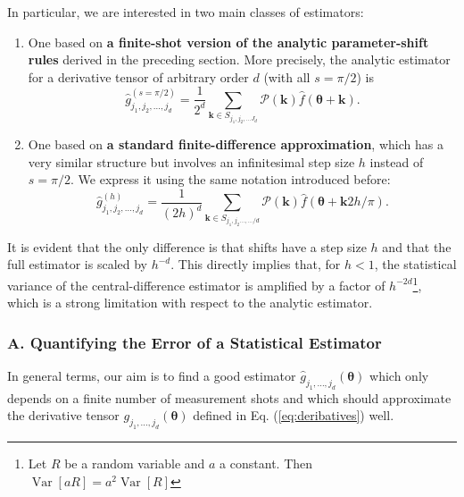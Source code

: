In particular, we are interested in two main classes of estimators: 
\begin{enumerate}
    \item One based on \textbf{a finite-shot version of the analytic parameter-shift rules} derived in the preceding section. More precisely, the analytic estimator for a derivative tensor of arbitrary order $d$ (with all $s=\pi /2$) is
\begin{equation}
    \hat{g}_{j_1, j_2, \ldots, j_d}^{(s=\pi / 2)}=\frac{1}{2^d} \sum_{\mathbf{k} \in S_{j_1, j_2, \ldots J_d}} \mathcal{P}(\mathbf{k}) \hat{f}(\boldsymbol{\theta}+\mathbf{k}).
\end{equation}
    \item One based on \textbf{a standard finite-difference approximation}, which has a very similar structure but involves an infinitesimal step size $h$ instead of $s=\pi / 2$. We express it using the same notation introduced before:
\begin{equation}
    \hat{g}_{j_1, j_2, \ldots, j_d}^{(h)}=\frac{1}{(2 h)^d} \sum_{\mathbf{k} \in S_{j_1, j_2 \ldots, \ldots / d}} \mathcal{P}(\mathbf{k}) \hat{f}(\boldsymbol{\theta}+\mathbf{k} 2 h / \pi) .
\end{equation}
\end{enumerate}

It is evident that the only difference is that shifts have a step size $h$ and that the full estimator is scaled by $h^{-d}$. This directly implies that, for $h<1$, the statistical variance of the central-difference estimator is amplified by a factor of $h^{-2 d}$\footnote{Let $R$ be a random variable and $a$ a constant. Then $\operatorname{Var}[a R]=a^2 \operatorname{Var}[R]$}, which is a strong limitation with respect to the analytic estimator.

\subsubsection{A. Quantifying the Error of a Statistical Estimator}

In general terms, our aim is to find a good estimator $\hat{g}_{j_1, \ldots, j_d}(\boldsymbol{\theta})$ which only depends on a finite number of measurement shots and which should approximate the derivative tensor $g_{j_1, \ldots, j_d}(\boldsymbol{\theta})$ defined in Eq. (\ref{eq:deribatives}) well. 

